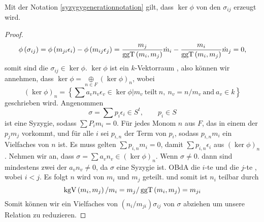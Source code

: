 \documentclass{article}
\begin{document}
	\begin{lem}
		Mit der Notation  \ref{syzygygenerationnotation} gilt,
		dass 
		\( \ker \phi \)
		von den
		\( \sigma_{ij} \)
		erzeugt wird.
		\begin{proof}
			\label{uniquesum}
			\[
				\phi\left( \sigma_{ij} \right) 
				= \phi \left(m_{ji} \epsilon_{i}\right) 
				- \phi \left(  m_{ij} \epsilon_{j}  \right)
				= \frac{m_{j}}{\operatorname{ggT}\left( m_{i} ,m_{j} \right) } \dot m_{i} 
				-\frac{m_{i}}{\operatorname{ggT}\left( m_{i} ,m_{j} \right) } \dot m_{j}
				= 0 ,
			\]
			somit sind die 
			\( \sigma_{ij} \in \ker \phi \).
			\( \ker \phi\)
			ist ein 
			\( k \)-Vektorraum ,
			also k\"onnen wir annehmen, dass 
			\( \ker \phi = \underset{n \in F }{\oplus}\left( \ker \phi \right)_{n}  \),
			wobei
			\[ 
				\left( \ker \phi \right)_{n} 
				= \left\{ 
					\sum a_{v} n_{v} \epsilon_{v} \in \ker \phi 
					\big| m_{v} \ \text{teilt} \  n, 
					\ n_{v} = n \slash m_{v} 
					\ \text{and} \ a_{v} \in k  
				\right\}
			\]
			geschrieben wird.
			Angenommen
			\[
				\sigma = \sum p_{i} \epsilon_{i} \in S^{t}, \qquad p_{i} \in S
			\]
			ist eine Syzygie,
			sodass
			\( \sum P_{i}m_{i} =0 \).
			F\"ur jedes Monom 
			\( n \)
			aus 
			\(F\),
			das in einem der 
			\( p_{j}m_{j} \)
			vorkommt,
			und f\"ur alle 
			\(i\) 
			sei 
			\( p_{i,n}\)
			der Term von
			\( p_{i} \),
			sodass 
			\( p_{i,n}m_{i} \)
			ein Vielfaches von 
			\( n\)
			ist.
			Es muss gelten
			\( \sum p_{i,n} m_{i}=0 \),
			damit 
			\( \sum p_{i,n} \epsilon_{i} \)
			aus 
			\( \left( \ker \phi \right)_{n}\).
			Nehmen wir an, dass 
			\( \sigma= \sum a_{v} n_{v}
			\in
			\left( \ker \phi \right)_{n} \).
			Wenn 
			\( \sigma \neq 0 \).
			dann sind mindestens zwei der 
			\( a_{v} n_{v} \neq 0 \),
			da 
			\( \sigma \) eine Syzygie ist.
			OBdA die 
			\(i\)-te 
			und die
			\(j\)-te
			, wobei 
			\( i<j \).
			Es folgt 
			\( n \) 
			wird von
			\( m_{i} \)
			und 
			\( m_{j} \) 
			geteilt.
			und somit ist 
			\( n_{i} \)
			teilbar durch
			\[
				\operatorname{kgV}\left( m_{i},m_{j} \right)/m_{i} 
				= m_{j} / \operatorname{ggT}\left( m_{i},m_{j} \right) 
				= m_{ji} 
			\]
			Somit k\"onnen wir ein Vielfaches von 
			\( \left( n_{i}/m_{ji} \right)\sigma_{ij} \)
			von 
			\( \sigma \) 
			abziehen um unsere Relation zu reduzieren.
		\end{proof}
	\end{lem}
\end{document}
